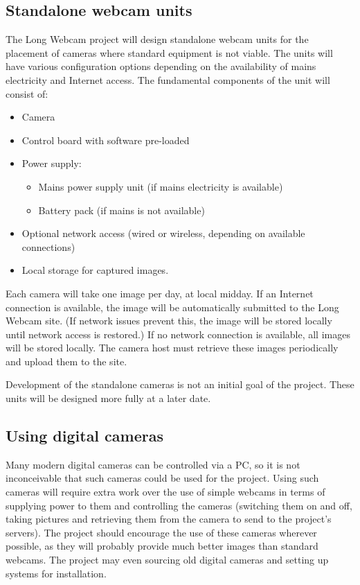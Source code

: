 \documentclass[11pt]{article}
\begin{document}
\subsection{Standalone webcam units}
\label{standalone}

The Long Webcam project will design standalone webcam units for the placement of cameras where standard equipment is not viable. The units will have various configuration options depending on the availability of mains electricity and Internet access. The fundamental components of the unit will consist of:

\begin{itemize}
\item Camera
\item Control board with software pre-loaded
\item Power supply:
\begin{itemize}
\item Mains power supply unit (if mains electricity is available)
\item Battery pack (if mains is not available)
\end{itemize}
\item Optional network access (wired or wireless, depending on available connections)
\item Local storage for captured images.
\end{itemize}

Each camera will take one image per day, at local midday. If an Internet connection is available, the image will be automatically submitted to the Long Webcam site. (If network issues prevent this, the image will be stored locally until network access is restored.) If no network connection is available, all images will be stored locally. The camera host must retrieve these images periodically and upload them to the site.

Development of the standalone cameras is not an initial goal of the project. These units will be designed more fully at a later date.

\subsection{Using digital cameras}
Many modern digital cameras can be controlled via a PC, so it is not inconceivable that such cameras could be used for the project. Using such cameras will require extra work over the use of simple webcams in terms of supplying power to them and controlling the cameras (switching them on and off, taking pictures and retrieving them from the camera to send to the project's servers). The project should encourage the use of these cameras wherever possible, as they will probably provide much better images than standard webcams. The project may even sourcing old digital cameras and setting up systems for installation.
\end{document}

